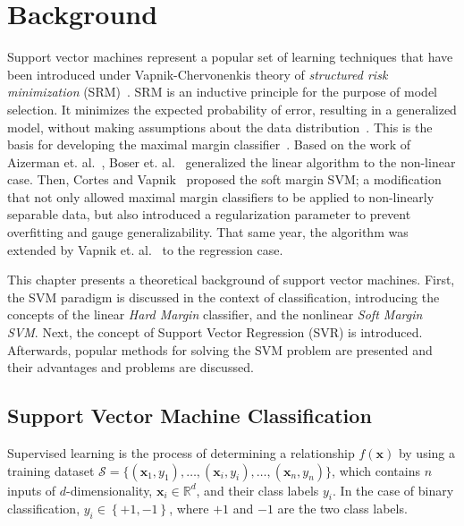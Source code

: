 \documentclass[reqno]{vcuthesis}
\newcommand{\set}[1]{{\left\{#1\right\}}}
\newcommand{\reals}{{\mathbb{R}}}
\numberwithin{equation}{chapter}
\begin{document}
\chapter{Background}
Support vector machines represent a popular set of learning techniques that have been introduced under Vapnik-Chervonenkis theory of \textit{structured risk minimization} (SRM)~\cite{boser1992training,Cortes1995,Kecman2001,Schoelkopf2002,Shalev2014}. SRM is an inductive principle for the purpose of model selection. It minimizes the expected probability of error, resulting in a generalized model, without making assumptions about the data distribution~\cite{Shalev2014,vapnik2015uniform}. This is the basis for developing the maximal margin classifier~\cite{vapnik2015uniform}. Based on the work of Aizerman et. al.~\cite{Aizerman67theoretical}, Boser et. al.~\cite{boser1992training} generalized the linear algorithm to the non-linear case. Then, Cortes and Vapnik~\cite{Cortes1995} proposed the soft margin SVM; a modification that not only allowed maximal margin classifiers to be applied to non-linearly separable data, but also introduced a regularization parameter to prevent overfitting and gauge generalizability. That same year, the algorithm was extended by Vapnik et. al.~\cite{vapnik2013nature} to the regression case.

This chapter presents a theoretical background of support vector machines. First, the SVM paradigm is discussed in the context of classification, introducing the concepts of the linear \textit{Hard Margin} classifier, and the nonlinear \textit{Soft Margin SVM}. Next, the concept of Support Vector Regression (SVR) is introduced. Afterwards, popular methods for solving the SVM problem are presented and their advantages and problems are discussed. 

\section{Support Vector Machine Classification}
Supervised learning is the process of determining a relationship $f(\bm x)$ by using a training dataset $\mathcal{S} = \{(\bm{x}_1,y_1),\ldots,(\bm{x}_i,y_i),\ldots,(\bm{x}_n,y_n)\}$, which contains $n$ inputs of $d$-dimensionality, $\bm x_i \in \reals^d$, and their class labels $y_i$. In the case of binary classification, $y_i \in \set{+1,-1}$, where $+1$ and $-1$ are the two class labels.
\end{document}
